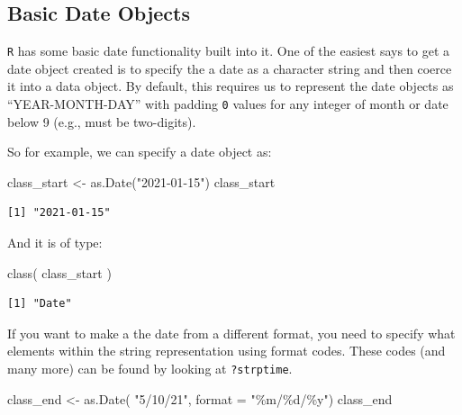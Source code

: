 \documentclass[
  letterpaper,
]{book}
\newenvironment{Shaded}{\begin{snugshade}}{\end{snugshade}}
\newcommand{\AttributeTok}[1]{\textcolor[rgb]{0.40,0.45,0.13}{#1}}
\newcommand{\FunctionTok}[1]{\textcolor[rgb]{0.28,0.35,0.67}{#1}}
\newcommand{\NormalTok}[1]{\textcolor[rgb]{0.00,0.23,0.31}{#1}}
\newcommand{\OtherTok}[1]{\textcolor[rgb]{0.00,0.23,0.31}{#1}}
\newcommand{\StringTok}[1]{\textcolor[rgb]{0.13,0.47,0.30}{#1}}
\begin{document}
\subsection{Basic Date Objects}\label{basic-date-objects}

\texttt{R} has some basic date functionality built into it. One of the
easiest says to get a date object created is to specify the a date as a
character string and then coerce it into a data object. By default, this
requires us to represent the date objects as ``YEAR-MONTH-DAY'' with
padding \texttt{0} values for any integer of month or date below 9
(e.g., must be two-digits).

So for example, we can specify a date object as:

\begin{Shaded}
\begin{Highlighting}[]
\NormalTok{class\_start }\OtherTok{\textless{}{-}} \FunctionTok{as.Date}\NormalTok{(}\StringTok{"2021{-}01{-}15"}\NormalTok{)}
\NormalTok{class\_start}
\end{Highlighting}
\end{Shaded}

\begin{verbatim}
[1] "2021-01-15"
\end{verbatim}

And it is of type:

\begin{Shaded}
\begin{Highlighting}[]
\FunctionTok{class}\NormalTok{( class\_start )}
\end{Highlighting}
\end{Shaded}

\begin{verbatim}
[1] "Date"
\end{verbatim}

If you want to make a the date from a different format, you need to
specify what elements within the string representation using format
codes. These codes (and many more) can be found by looking at
\texttt{?strptime}.

\begin{Shaded}
\begin{Highlighting}[]
\NormalTok{class\_end }\OtherTok{\textless{}{-}} \FunctionTok{as.Date}\NormalTok{( }\StringTok{"5/10/21"}\NormalTok{, }\AttributeTok{format =} \StringTok{"\%m/\%d/\%y"}\NormalTok{)}
\NormalTok{class\_end}
\end{Highlighting}
\end{Shaded}
\end{document}
